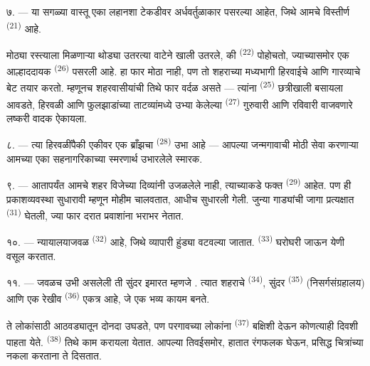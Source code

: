 ७. --- या सगळ्या वास्तू एका लहानशा टेकडीवर अर्धवर्तुळाकार पसरल्या आहेत, जिथे आमचे विस्तीर्ण
 \textsuperscript{(21)} आहे.

मोठ्या रस्त्याला मिळणाऱ्या थोड्या उतरत्या वाटेने खाली उतरले, की 
\textsuperscript{(22)} पोहोचतो, ज्याच्यासमोर एक आल्हाददायक 
\textsuperscript{(26)} पसरली आहे. हा  फार मोठा नाही, पण तो शहराच्या
मध्यभागी हिरवाईचे आणि गारव्याचे बेट तयार करतो. म्हणूनच शहरवासीयांची तिथे फार वर्दळ असते —
त्यांना  \textsuperscript{(25)} छत्रीखाली बसायला आवडते, हिरवळी आणि
फुलझाडांच्या ताटव्यांमध्ये उभ्या केलेल्या  \textsuperscript{(27)} गुरुवारी आणि
रविवारी वाजवणारे लष्करी वादक ऐकायला.

८. --- त्या हिरवळींपैकी एकीवर एक ब्राँझचा  \textsuperscript{(28)} उभा आहे —
आपल्या जन्मगावाची मोठी सेवा करणाऱ्या आमच्या एका सहनागरिकाच्या स्मरणार्थ उभारलेले स्मारक.

\VUsaut{4.0mm}
\VUsaut{3.4mm}

९. --- आतापर्यंत आमचे शहर विजेच्या दिव्यांनी उजळलेले नाही, त्याच्याकडे फक्त
 \textsuperscript{(29)} आहेत. पण  ही प्रकाशव्यवस्था
सुधारावी म्हणून मोहीम चालवतात,   आधीच
सुधारली गेली.    जुन्या गाड्यांची जागा
प्रत्यक्षात  \textsuperscript{(31)} घेतली, ज्या फार 
दरात प्रवाशांना  भराभर नेतात.

१०. --- न्यायालयाजवळ  \textsuperscript{(32)} आहे, जिथे व्यापारी हुंड्या वटवल्या
जातात.  \textsuperscript{(33)} घरोघरी जाऊन येणी वसूल करतात.

\VUsaut{4.0mm}
\VUsaut{3.4mm}

११. --- जवळच उभी असलेली ती सुंदर इमारत म्हणजे . त्यात शहराचे
 \textsuperscript{(34)},  सुंदर 
\textsuperscript{(35)} (निसर्गसंग्रहालय) आणि एक रेखीव 
\textsuperscript{(36)} एकत्र आहे, जे एक भव्य कायम  बनते.

ते लोकांसाठी आठवड्यातून दोनदा उघडते, पण परगावच्या लोकांना 
\textsuperscript{(37)} बक्षिशी देऊन कोणत्याही दिवशी पाहता येते. 
\textsuperscript{(38)} तिथे काम करायला येतात. आपल्या तिवईसमोर, हातात रंगफलक घेऊन, प्रसिद्ध
चित्रांच्या नकला करताना ते दिसतात.

